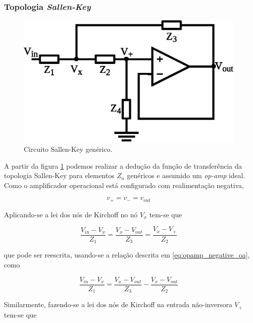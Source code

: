 \vspace{4cm}

\subsubsection{Topologia \textit{Sallen-Key}}

\begin{figure}[H]
  \centering
  \includegraphics{images/Sallen_Key_generic}
  \caption{Circuito Sallen-Key genérico.}
  \label{fig:sallen_key_generic}
\end{figure}

A partir da figura \ref{fig:sallen_key_generic} podemos realizar a dedução da função de transferência da topologia Sallen-Key para elementos $Z_n$ genéricos e assumido um \textit{op-amp} ideal. Como o amplificador operacional está configurado com realimentação negativa,

\begin{equation}
v_+ = v_- = v_{out}
\label{eq:opamp_negative_oa}
\end{equation}

Aplicando-se a lei dos nós de Kirchoff no nó $V_{x}$ tem-se que 

\begin{equation}
\frac{V_{in} - V_{x}}{Z_1} = \frac{V_x - V_{out}}{Z_3} = \frac{V_x - V_+}{Z_2}
\end{equation}

que pode ser reescrita, usando-se a relação descrita em \ref{eq:opamp_negative_oa}, como

\begin{equation}
\frac{V_{in} - V_{x}}{Z_1} = \frac{V_x - V_{out}}{Z_3} - \frac{V_x - V_{out}}{Z_2}
\end{equation}

Similarmente, fazendo-se a lei dos nós de Kirchoff na entrada não-inversora $V_+$ tem-se que

